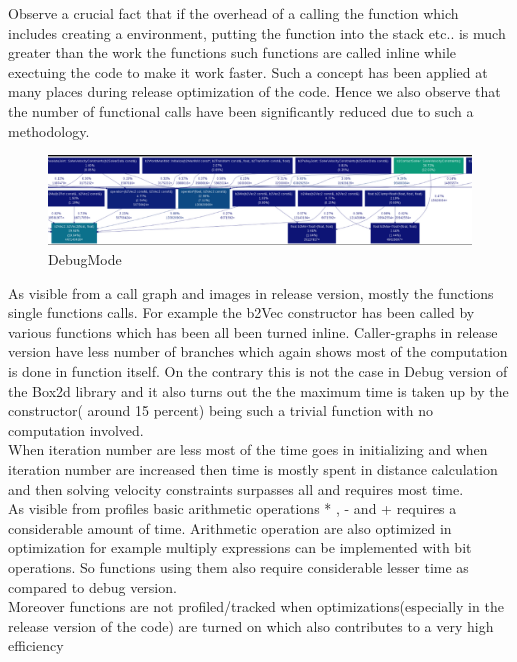 \documentclass[a4paper,11pt]{article}
\begin{document}
Observe a crucial fact that if the overhead of a calling the function which includes creating a environment, putting the function into the stack etc.. is much greater than the work the functions such functions are called inline while exectuing the code to make it work faster. Such a concept has been applied at many places during release optimization of the code. 
Hence we also observe that the number of functional calls have been significantly reduced due to such a methodology.\\
\begin{figure}[ht]
	\includegraphics[width=180mm]{3.eps}
	\caption{DebugMode}			
\end{figure}
As visible from a call graph and images in release version, mostly the functions single functions calls.
For example  the b2Vec constructor has been called by various functions which has been  all been turned inline.
Caller-graphs in release version have less number of branches which again shows most of the computation is done in function itself. On the contrary this is not the case in Debug version of the Box2d library and it also turns out the the maximum time is taken up by the constructor( around 15 percent) being such a trivial function with no computation involved.\\
When iteration number are less most of the time goes in initializing and when iteration number are increased then time is mostly spent in distance calculation and then solving velocity constraints surpasses all and requires most time.\\

As visible from profiles basic arithmetic operations * , - and + requires a considerable amount of time. Arithmetic operation are also optimized in optimization for example multiply expressions can be implemented with bit operations. So functions using them also require considerable lesser time as compared to debug version.
\\
Moreover functions are not profiled/tracked when optimizations(especially in the release version of the code) are turned on which also contributes to a very high efficiency
\\
\end{document}
